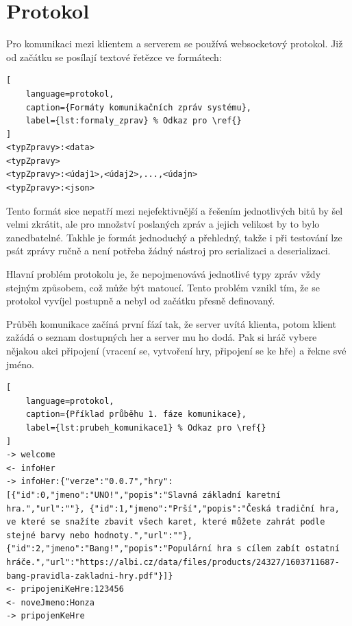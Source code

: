\section{Protokol}
Pro komunikaci mezi klientem a serverem se používá websocketový protokol. Již od začátku se posílají textové řetězce ve formátech:

\begin{lstlisting}[
    language=protokol, 
    caption={Formáty komunikačních zpráv systému}, 
    label={lst:formaly_zprav} % Odkaz pro \ref{}
]
<typZpravy>:<data>
<typZpravy>
<typZpravy>:<údaj1>,<údaj2>,...,<údajn>
<typZpravy>:<json>
\end{lstlisting}

Tento formát sice nepatří mezi nejefektivnější a řešením jednotlivých bitů by šel velmi zkrátit, ale pro množství poslaných zpráv a jejich velikost by to bylo zanedbatelné. Takhle je formát jednoduchý a přehledný, takže i při testování lze psát zprávy ručně a není potřeba žádný nástroj pro serializaci a deserializaci.

Hlavní problém protokolu je, že nepojmenovává jednotlivé typy zpráv vždy stejným způsobem, což může být matoucí. Tento problém vznikl tím, že se protokol vyvíjel postupně a nebyl od začátku přesně definovaný.



Průběh komunikace začíná první fází tak, že server uvítá klienta, potom klient zažádá o seznam dostupných her a server mu ho dodá. Pak si hráč vybere nějakou akci připojení (vracení se, vytvoření hry, připojení se ke hře) a řekne své jméno.
\begin{lstlisting}[
    language=protokol, 
    caption={Příklad průběhu 1. fáze komunikace}, 
    label={lst:prubeh_komunikace1} % Odkaz pro \ref{}
]
-> welcome
<- infoHer
-> infoHer:{"verze":"0.0.7","hry":[{"id":0,"jmeno":"UNO!","popis":"Slavná základní karetní hra.","url":""}, {"id":1,"jmeno":"Prší","popis":"Česká tradiční hra, ve které se snažíte zbavit všech karet, které můžete zahrát podle stejné barvy nebo hodnoty.","url":""}, {"id":2,"jmeno":"Bang!","popis":"Populární hra s cílem zabít ostatní hráče.","url":"https://albi.cz/data/files/products/24327/1603711687-bang-pravidla-zakladni-hry.pdf"}]}
<- pripojeniKeHre:123456
<- noveJmeno:Honza
-> pripojenKeHre
\end{lstlisting}

